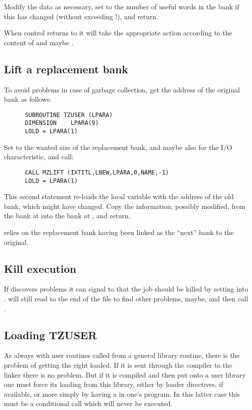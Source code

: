 Modify the data as necessary, set  to the number of useful
words in the bank if this has changed (without exceeding !),
and return.

When control returns to  it will take the appropriate action
according to the content of  and maybe .

\subsection*{Lift a replacement bank}

To avoid problems in case of garbage collection,
get the address of the original bank as follows:
\begin{verbatim}
      SUBROUTINE TZUSER (LPARA)
      DIMENSION    LPARA(9)
      LOLD = LPARA(1)
\end{verbatim} 
Set  to the wanted size of the replacement bank,
and maybe also for the I/O characteristic,
and call:
\begin{verbatim}
      CALL MZLIFT (IXTITL,LNEW,LPARA,0,NAME,-1)
      LOLD = LPARA(1)
\end{verbatim} 
This second statement re-loads the local variable  with
the address of the old bank, which might have changed.
Copy the information, possibly modified, from the bank at 
into the bank at , and return.

 relies on the replacement bank having been
linked as the ``next'' bank to the original.

\subsection*{Kill execution}

If  discovers problems it can signal to 
that the job should be killed by setting  into .
 will still read to the end of the file to find other
problems, maybe, and then call .

\subsection*{Loading TZUSER}

As always with user routines called from a general library
routine, there is the problem of getting the right  loaded.
If it is sent through the compiler to the linker there is no
problem. But if it is compiled and then put onto a user
library one must force its loading from this library,
either by loader directives, if available, or more simply
by having a  in one's  program.
In this latter case this must be a conditional
call which will never be executed.

